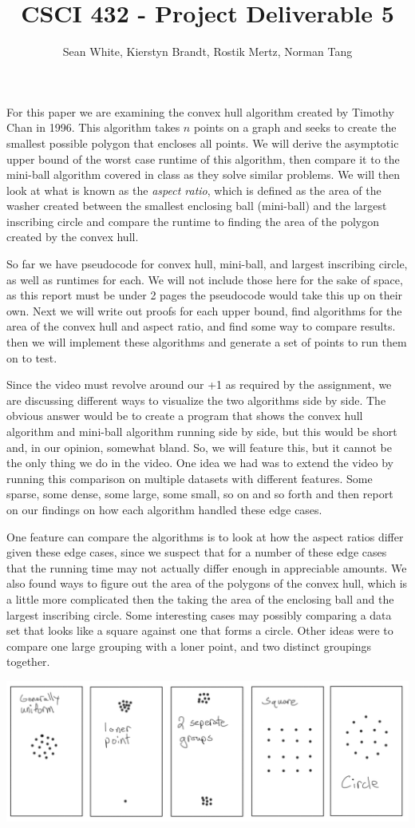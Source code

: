 \documentclass[12pt]{article}
\author{Sean White, Kierstyn Brandt, Rostik Mertz, Norman Tang}
\title{CSCI 432 - Project Deliverable 5}
\begin{document}
\maketitle

For this paper we are examining the convex hull algorithm created by Timothy Chan in 1996. This algorithm takes $n$ points on a graph and seeks to create the smallest possible polygon that encloses all points. We will derive the asymptotic upper bound of the worst case runtime of this algorithm, then compare it to the mini-ball algorithm covered in class as they solve similar problems. We will then look at what is known as the \textit{aspect ratio}, which is defined as the area of the washer created between the smallest enclosing ball (mini-ball) and the largest inscribing circle and compare the runtime to finding the area of the polygon created by the convex hull.

So far we have pseudocode for convex hull, mini-ball, and largest inscribing circle, as well as runtimes for each. We will not include those here for the sake of space, as this report must be under 2 pages the pseudocode would take this up on their own. Next we will write out proofs for each upper bound, find algorithms for the area of the convex hull and aspect ratio, and find some way to compare results. then we will implement these algorithms and generate a set of points to run them on to test. 

Since the video must revolve around our +1 as required by the assignment, we are discussing different ways to visualize the two algorithms side by side. The obvious answer would be to create a program that shows the convex hull algorithm and mini-ball algorithm running side by side, but this would be short and, in our opinion, somewhat bland. So, we will feature this, but it cannot be the only thing we do in the video. One idea we had was to extend the video by running this comparison on multiple datasets with different features. Some sparse, some dense, some large, some small, so on and so forth and then report on our findings on how each algorithm handled these edge cases.

One feature can compare the algorithms is to look at how the aspect ratios differ given these edge cases, since we suspect that for a number of these edge cases that the running time may not actually differ enough in appreciable amounts. We also found ways to figure out the area of the polygons of the convex hull, which is a little more complicated then the taking the area of the enclosing ball and the largest inscribing circle. Some interesting cases may possibly comparing a data set that looks like a square against one that forms a circle. Other ideas were to compare one large grouping with a loner point, and two distinct groupings together.

\includegraphics[width=\textwidth]{EdgeCases.png}
\end{document}
